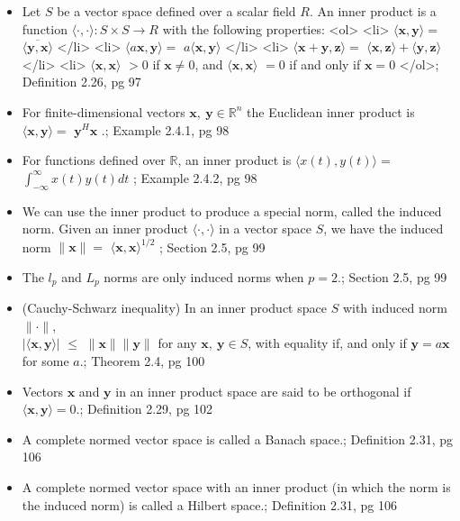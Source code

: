 \documentclass{article}
\begin{document}
\begin{multicols}{2}
\begin{itemize}
\item Let $S$ be a vector space defined over a scalar field $R$. An inner product is a function $\langle \cdot, \cdot \rangle : S \times S \to R $ with the following properties: <ol> <li> $ \langle \mathbf{x}, \mathbf{y} \rangle =$ $\overline{\langle \mathbf{y}, \mathbf{x} \rangle} $  </li> <li>  $ \langle a\mathbf{x}, \mathbf{y} \rangle =$  $a\langle \mathbf{x}, \mathbf{y} \rangle $  </li> <li>  $ \langle \mathbf{x} + \mathbf{y}, \mathbf{z} \rangle =$ $\langle \mathbf{x}, \mathbf{z} \rangle + \langle \mathbf{y}, \mathbf{z} \rangle $  </li> <li> $\langle \mathbf{x}, \mathbf{x} \rangle $ $ > 0$ if $\mathbf{x} \neq 0$, and $\langle \mathbf{x}, \mathbf{x} \rangle $ $ = 0$ if and only if $\mathbf{x} = 0$ </ol>; Definition 2.26, pg 97
\item For finite-dimensional vectors $\mathbf{x},\: \mathbf{y} \in \mathbb{R}^n$ the Euclidean inner product is $ \langle \mathbf{x}, \mathbf{y} \rangle =$  $\mathbf{y}^H\mathbf{x} $ .; Example 2.4.1, pg 98
\item For functions defined over $\mathbb{R}$, an inner product is $ \langle x(t), y(t) \rangle =$ $\int_{-\infty}^{\infty} x(t) y(t) dt$ ; Example 2.4.2, pg 98
\item We can use the inner product  to produce a special norm, called the induced norm. Given an inner product $\langle \cdot, \cdot \rangle$ in a vector space $S$, we have the induced norm $\|\mathbf{x}\| = $ $\langle \mathbf{x}, \mathbf{x} \rangle^{1/2} $ ; Section 2.5, pg 99
\item The $l_p$ and $L_p$ norms are only induced norms when  $p = 2$.; Section 2.5, pg 99
\item (Cauchy-Schwarz inequality) In an inner product space $S$ with induced norm $\|\cdot\|$, \\
$| \langle \mathbf{x}, \mathbf{y} \rangle | $ $ \leq $ $ \|\mathbf{x}\| \|\mathbf{y} \|$ for any $\mathbf{x},\:\mathbf{y} \in S$, with equality if, and only if $\mathbf{y} = a\mathbf{x} $ for some $a$.; Theorem 2.4, pg 100
\item Vectors $\mathbf{x}$ and $\mathbf{y}$ in an inner product space are said to be orthogonal if $\langle \mathbf{x}, \mathbf{y} \rangle = 0 $.; Definition 2.29, pg 102
\item A complete normed vector space is called a Banach space.; Definition 2.31, pg 106
\item A complete normed vector space with an inner product (in which the norm is the induced norm) is called a Hilbert space.; Definition 2.31, pg 106

\end{itemize}
\end{multicols}
\end{document}
